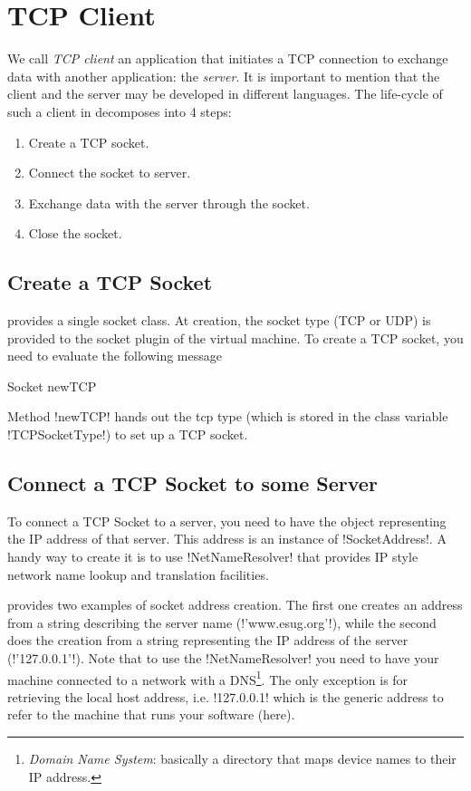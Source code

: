 \documentclass[a4paper,10pt,twoside]{book}
\begin{document}
\section{TCP Client}
\label{sec:clientTcpSocket}
We call \textit{TCP client}  an application that initiates a TCP connection to exchange data with another application: the \textit{server}.
It is important to mention that the client and the server may be developed in different languages.
The life-cycle of such a client in \pharo decomposes into 4 steps:
\begin{enumerate}
\item Create a TCP socket.
\item Connect the socket to  server.
\item Exchange data with the server through the socket.
\item Close the socket.
\end{enumerate}

\subsection{Create a TCP Socket}
\pharo provides a single socket class.
At creation, the socket type (TCP or UDP) is provided to the socket plugin of the virtual machine.
To create a TCP socket, you need to evaluate the following message 
\begin{code}{}
Socket newTCP
\end{code}
Method \ct!newTCP! hands out the tcp type (which is stored in the class variable \ct!TCPSocketType!) to set up a TCP socket.

\subsection{Connect a TCP Socket to some Server}
To connect a TCP Socket to a server, you need to have the object representing the IP address of that server. This address is an instance of \ct!SocketAddress!.
A handy way to create it is to use \ct!NetNameResolver! that  provides IP style network name lookup and translation facilities.

 provides two examples of socket address creation.
The first one creates an address from a string describing the server name (\ct!'www.esug.org'!), while the second does the creation from a string representing the  IP address of the server (\ct!'127.0.0.1'!).
Note that to use the \ct!NetNameResolver! you need to have your machine connected to a network with a DNS\footnote{\emph{Domain Name System}: basically a directory that maps device names to their IP address.}.
The only exception is for retrieving the local host address, i.e. \ct!127.0.0.1! which is the generic address to refer to the machine that runs your software (\pharo here).
\end{document}
